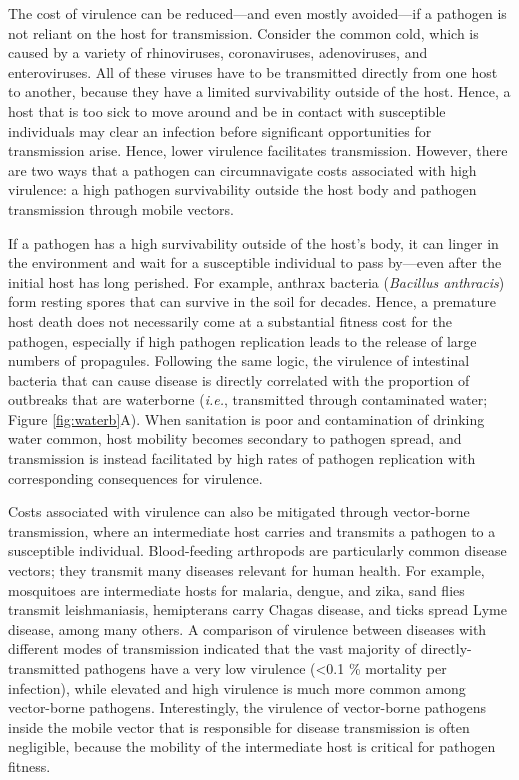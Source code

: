 \documentclass[
]{book}
\begin{document}
The cost of virulence can be reduced---and even mostly avoided---if a pathogen is not reliant on the host for transmission. Consider the common cold, which is caused by a variety of rhinoviruses, coronaviruses, adenoviruses, and enteroviruses. All of these viruses have to be transmitted directly from one host to another, because they have a limited survivability outside of the host. Hence, a host that is too sick to move around and be in contact with susceptible individuals may clear an infection before significant opportunities for transmission arise. Hence, lower virulence facilitates transmission. However, there are two ways that a pathogen can circumnavigate costs associated with high virulence: a high pathogen survivability outside the host body and pathogen transmission through mobile vectors.

If a pathogen has a high survivability outside of the host's body, it can linger in the environment and wait for a susceptible individual to pass by---even after the initial host has long perished. For example, anthrax bacteria (\emph{Bacillus anthracis}) form resting spores that can survive in the soil for decades. Hence, a premature host death does not necessarily come at a substantial fitness cost for the pathogen, especially if high pathogen replication leads to the release of large numbers of propagules. Following the same logic, the virulence of intestinal bacteria that can cause disease is directly correlated with the proportion of outbreaks that are waterborne (\emph{i.e.}, transmitted through contaminated water; Figure \ref{fig:waterb}A). When sanitation is poor and contamination of drinking water common, host mobility becomes secondary to pathogen spread, and transmission is instead facilitated by high rates of pathogen replication with corresponding consequences for virulence.

Costs associated with virulence can also be mitigated through vector-borne transmission, where an intermediate host carries and transmits a pathogen to a susceptible individual. Blood-feeding arthropods are particularly common disease vectors; they transmit many diseases relevant for human health. For example, mosquitoes are intermediate hosts for malaria, dengue, and zika, sand flies transmit leishmaniasis, hemipterans carry Chagas disease, and ticks spread Lyme disease, among many others. A comparison of virulence between diseases with different modes of transmission indicated that the vast majority of directly-transmitted pathogens have a very low virulence (\textless0.1 \% mortality per infection), while elevated and high virulence is much more common among vector-borne pathogens. Interestingly, the virulence of vector-borne pathogens inside the mobile vector that is responsible for disease transmission is often negligible, because the mobility of the intermediate host is critical for pathogen fitness.
\end{document}
